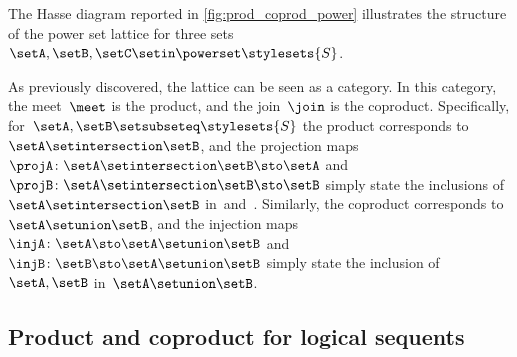 \begin{marginfigure}
    \centering
    \caption{}
    \label{fig:prod_coprod_power}
\end{marginfigure}

The Hasse diagram reported in \cref{fig:prod_coprod_power} illustrates the structure of the power set lattice for three sets~$\setA,\setB,\setC\setin \powerset \stylesets{S}$.

As previously discovered, the lattice can be seen as a category.
In this category, the meet~$\meet$ is the product, and the join~$\join$ is the coproduct.
Specifically, for~$\setA,\setB\setsubseteq\stylesets{S}$ the product corresponds to~$\setA\setintersection \setB$, and the projection maps~$\projA\colon \setA\setintersection \setB \sto \setA$ and~$\projB\colon \setA\setintersection \setB \sto \setB$ simply state the inclusions of~$\setA\setintersection \setB$ in~\setA and~\setB.
Similarly, the coproduct corresponds to~$\setA\setunion \setB$, and the injection maps~$\injA\colon \setA \sto \setA\setunion \setB$ and~$\injB\colon \setB \sto \setA\setunion \setB$ simply state the inclusion of~$\setA,\setB$ in~$\setA\setunion \setB$.
\vfill\clearpage
\subsection{Product and coproduct for logical sequents}

